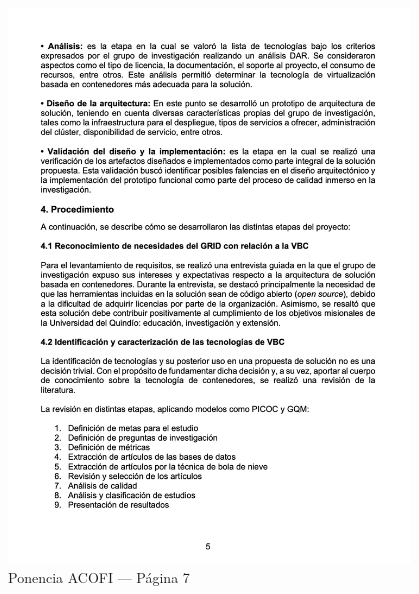 \begin{figure}[H]
	\centering
	\begin{tcolorbox}[
			colback=white,
			colframe=gray!50,
			boxrule=1pt,
			arc=2pt,
			boxsep=5pt,
			left=3pt,
			right=3pt,
			top=3pt,
			bottom=3pt,
			drop shadow
		]
		\includegraphics[width=0.95\textwidth,keepaspectratio]{apendices/ACOFI/pagina_7.png}
	\end{tcolorbox}
	\caption{Ponencia ACOFI --- Página 7}\label{fig:acofi-pagina-7}
\end{figure}
\FloatBarrier%
